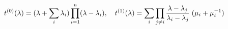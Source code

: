 \begin{equation}
t^{(0)}(\lambda) =  (\lambda + \sum_i \lambda_i) \prod_{i=1}^n (\lambda - \lambda_i), \quad
t^{(1)}(\lambda) =   \sum_i  \prod_{j\neq i} {\lambda-\lambda_j\over \lambda_i -\lambda_j}
 \;(\mu_i + \mu_i^{-1})
 \label{lagrangebis}
\end{equation}

